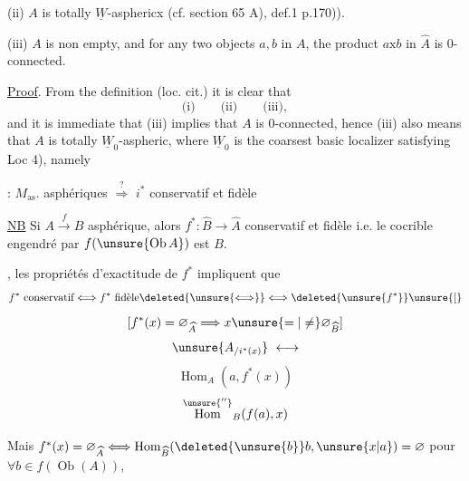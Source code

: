 (ii) $A$ is totally $\underline W$-asphericx (cf. section 65 A), def.1 p.170)).

(iii) $A$ is non empty, and for any two objects $a,b$ in $A$,
 the product $a\mathbin{\mathrm{x}}b$
in $\widehat A$ is 0-connected.

\uline{Proof}. From the definition (loc. cit.) it is clear that
\[
\text{(i)}\qquad\text{(ii)}\qquad\text{(iii)},
\]
and it is immediate that (iii) implies that $A$ is 0-connected, hence
(iii) also means that $A$ is totally $\underline W_0$-aspheric,
where $\underline W_0$ is the coarsest basic localizer satisfying Loc 4), namely

: $M_{\mathrm{as}}.$ asphériques $\overset{?}{\Longrightarrow}$
$i^*$ conservatif et fidèle

\uline{NB} Si $A\xrightarrow f B$ asphérique, alors
$f^*: \widehat B\longrightarrow\widehat A$ conservatif et fidèle
i.e. le cocrible engendré par $f(\unsure{\operatorname{Ob}A})$ est $B$.

, les propriétés d'exactitude de $f^*$ impliquent que
\[
f^*\text{ conservatif}\Longleftrightarrow f^*\text{ fidèle}
\deleted{\unsure{\Longleftrightarrow}}\Longleftrightarrow
\deleted{\unsure{f^*}}\unsure{[}
\]
\[
[f^*(x)=\varnothing_{\widehat A}\Longrightarrow x\unsure{=|\ne}\varnothing_{\widehat B}]
\]
\[
\unsure{A_{/i^*(x)}}\ \longleftrightarrow
\]
\[
\operatorname{Hom}_A(a,f^*(x))
\]
\[
\overset{\unsure{''}}{\operatorname{Hom}}_B(f(a),x)
\]

Mais $f^*(x)=\varnothing_{\widehat A}\Longleftrightarrow
\operatorname{Hom}_{\widehat B}(\deleted{\unsure{b}}b,\unsure{x|a})
=\varnothing$ pour $\forall b\in f(\operatorname{Ob}(A))$,

